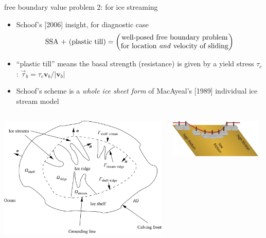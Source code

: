 \begin{frame}{free boundary value problem 2: for ice streaming}

\begin{itemize}
\item  Schoof's [2006] insight, for diagnostic case
  $$\text{SSA + (plastic till)} = \begin{pmatrix}
\text{well-posed free boundary problem} \\ \text{for location \emph{and} velocity of sliding}
\end{pmatrix} $$
\item ``plastic till'' means the basal strength (resistance) is given by a yield stress $\tau_c$:  \qquad $\vec\tau_b = \tau_c \mathbf{v}_b / |\mathbf{v}_b|$
\item Schoof's scheme is a \emph{whole ice sheet form} of MacAyeal's [1989] individual ice stream model
\end{itemize}

\begin{columns}
\begin{column}{0.5\textwidth}
\begin{center}
  \includegraphics[width=1.0\textwidth]{photos/schoof_planform}
\end{center}
\end{column}
\begin{column}{0.5\textwidth}
\begin{center}
  \includegraphics[width=0.95\textwidth]{photos/schoof_sliders}
\end{center}
\end{column}
\end{columns}
\end{frame}


